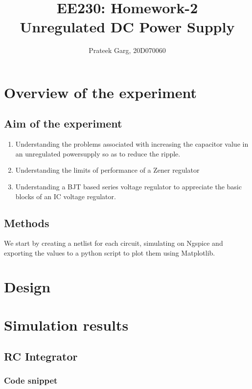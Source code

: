 \documentclass[12pt]{article}
\title{EE230: Homework-2\\
Unregulated DC Power Supply}
\author{Prateek Garg, 20D070060}
\begin{document}
\noindent
\maketitle

\section{Overview of the experiment} %

\subsection{Aim of the experiment}%
\begin{enumerate}
	\item Understanding the problems associated with increasing the capacitor value in an unregulated powersupply so as to reduce the ripple.
  \item Understanding the limits of performance of a Zener regulator
  \item Understanding a BJT based series voltage regulator to appreciate the basic blocks of an IC voltage regulator.
\end{enumerate}


\subsection{Methods}

We start by creating a netlist for each circuit, simulating on Ngspice and exporting the values to a python script to plot them using Matplotlib.
\section{Design}
%
%

\section{Simulation results}

\subsection{RC Integrator}
\subsubsection{Code snippet}

\end{document}

